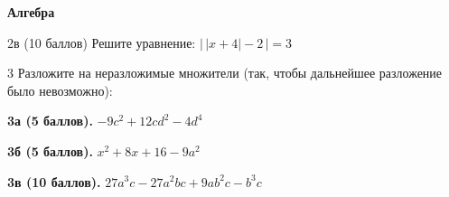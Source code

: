 
\begin{center}
    \textbf{Алгебра}
\end{center} 



\smallskip


\smallskip


\smallskip

\begin{problem}{2в (10 баллов)}
Решите уравнение: $\bigl|\,|x+4|-2\,\bigr|=3$
\end{problem}

\smallskip

\noindent{}

\smallskip

\begin{problem}{3}
Разложите на неразложимые множители (так, чтобы дальнейшее разложение было невозможно):
\end{problem}

\bigskip

\noindent \textbf{3а (5 баллов).} $-9c^2 + 12cd^2 - 4d^4$

\smallskip

\rowans{1ex}

\bigskip

\noindent \textbf{3б (5 баллов).} $x^2 + 8x + 16 - 9a^2$

\smallskip

\rowans{1ex}

\bigskip

\noindent \textbf{3в (10 баллов).} $27a^3c - 27a^2bc + 9ab^2c - b^3c$

\smallskip

\rowans{1ex}


